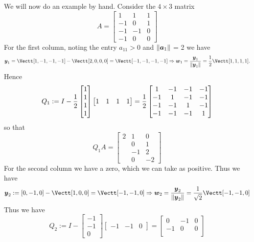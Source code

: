 \begin{example}[QR by hand] We will now do an example by hand. Consider the $4 \ensuremath{\times} 3$ matrix
\[
A = \begin{bmatrix} 
1 & 1 & 1 \\ 
-1 & 0 & 1 \\
-1 & -1 & 0 \\
-1 & 0 & 0
\end{bmatrix}
\]
For the first column, noting the entry $a_{11} > 0$ and $\| \bm{{\mbox{\boldmath$a$\unboldmath}}}_1 \|$ = 2 we have
\[
\ensuremath{\bm{\y}}_1 = \Vectt[1,-1,-1,-1]  - \Vectt[2,0,0,0] = \Vectt[-1,-1,-1,-1] \ensuremath{\Rightarrow} \ensuremath{\bm{\w}}_1 = {\ensuremath{\bm{\y}}_1 \over \| \ensuremath{\bm{\y}}_1 \|} = {1 \over 2} \Vectt[1,1,1,1].
\]
Hence
\[
Q_1 := I - {1 \over 2} \begin{bmatrix} 1 \\ 1 \\ 1 \\ 1 \end{bmatrix} \begin{bmatrix} 1 & 1 & 1 & 1 \end{bmatrix} =
 {1 \over 2} \begin{bmatrix}
1 & -1 & -1 & -1 \\
-1 & 1 & -1 & -1 \\
-1 & -1 & 1 & -1 \\
-1 & -1 & -1 &  1
\end{bmatrix}
\]
so that
\[
Q_1 A = \begin{bmatrix} 2 &  1 & 0 \\
 & 0 & 1 \\
  & -1 & 2 \\
& 0 & -2
\end{bmatrix}
\]
For the second column we have a zero, which we can take as positive. Thus we have
\[
\ensuremath{\bm{\y}}_2 :=  [0,-1,0] - \Vectt[1,0,0] = \Vectt[-1,-1,0]  \ensuremath{\Rightarrow} \ensuremath{\bm{\w}}_2 = {\ensuremath{\bm{\y}}_2 \over \| \ensuremath{\bm{\y}}_2 \|} = {1 \over \sqrt{2}} \Vectt[-1,-1,0]
\]
Thus we have
\[
Q_2 := I - 
 \begin{bmatrix} -1 \\ -1 \\ 0
\end{bmatrix} \begin{bmatrix} -1 & -1 & 0 \end{bmatrix}
= \begin{bmatrix}
0 & -1 & 0 \\
-1& 0 & 0 \\

\end{bmatrix}\]
\end{example}
